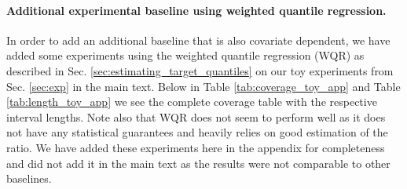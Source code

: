 \paragraph{Additional experimental baseline using weighted quantile regression.}
In order to add an additional baseline that is also covariate dependent, we have added some experiments using the weighted quantile regression (WQR) as described in Sec. \ref{sec:estimating_target_quantiles} on our toy experiments from Sec. \ref{sec:exp} in the main text. Below in Table \ref{tab:coverage_toy_app} and Table \ref{tab:length_toy_app} we see the complete coverage table with the respective interval lengths. Note also that WQR does not seem to perform well as it does not have any statistical guarantees and heavily relies on good estimation of the ratio. We have added these experiments here in the appendix for completeness and did not add it in the main text as the results were not comparable to other baselines.

\begin{table}[t]
      \centering
      \caption{Mean Coverage as a function of policy shift with 2 standard errors over 10 runs. We have added weighted quantile regression (WQR) for completeness and note that it does not seem to perform well.}\label{tab:coverage_toy_app}
\end{table}



